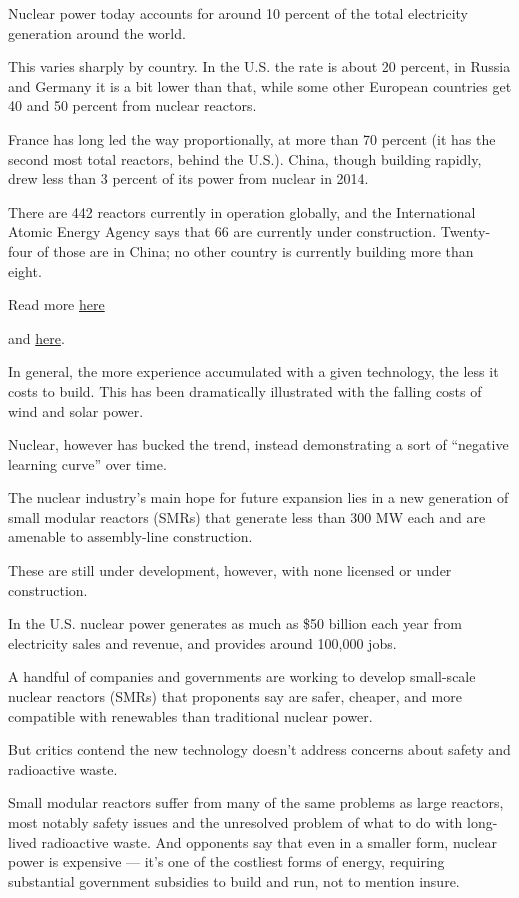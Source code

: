 \documentclass[
]{book}
\begin{document}
Nuclear power today accounts for around 10 percent of the total electricity generation around the world.

This varies sharply by country. In the U.S. the rate is about 20 percent, in Russia and Germany it is a bit lower than that, while some other European countries get 40 and 50 percent from nuclear reactors.

France has long led the way proportionally, at more than 70 percent (it has the second most total reactors, behind the U.S.). China, though building rapidly, drew less than 3 percent of its power from nuclear in 2014.

There are 442 reactors currently in operation globally, and the International Atomic Energy Agency says that 66 are currently under construction. Twenty-four of those are in China; no other country is currently building more than eight.

Read more \href{https://world-nuclear.org/information-library/current-and-future-generation/nuclear-power-in-the-world-today.aspx}{here}

and \href{https://world-nuclear.org/information-library/nuclear-fuel-cycle/introduction/nuclear-fuel-cycle-overview.aspx}{here}.

In general, the more experience accumulated with a given technology, the less it costs to build. This has been dramatically illustrated with the falling costs of wind and solar power.

Nuclear, however has bucked the trend, instead demonstrating a sort of ``negative learning curve'' over time.

The nuclear industry's main hope for future expansion lies in a new generation of small modular reactors (SMRs) that generate less than 300 MW each and are amenable to assembly-line construction.

These are still under development, however, with none licensed or under construction.

In the U.S. nuclear power generates as much as \$50 billion each year from electricity sales and revenue, and provides around 100,000 jobs.

A handful of companies and governments are working to develop small-scale nuclear reactors (SMRs) that proponents say are safer, cheaper, and more compatible with renewables than traditional nuclear power.

But critics contend the new technology doesn't address concerns about safety and radioactive waste.

Small modular reactors suffer from many of the same problems as large reactors, most notably safety issues and the unresolved problem of what to do with long-lived radioactive waste. And opponents say that even in a smaller form, nuclear power is expensive --- it's one of the costliest forms of energy, requiring substantial government subsidies to build and run, not to mention insure.
\end{document}
